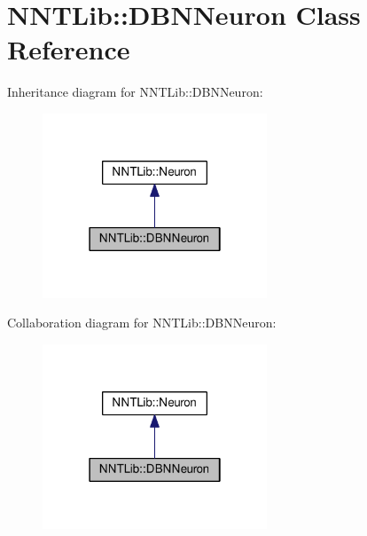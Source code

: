 \hypertarget{class_n_n_t_lib_1_1_d_b_n_neuron}{}\section{N\+N\+T\+Lib\+:\+:D\+B\+N\+Neuron Class Reference}
\label{class_n_n_t_lib_1_1_d_b_n_neuron}


Inheritance diagram for N\+N\+T\+Lib\+:\+:D\+B\+N\+Neuron\+:\nopagebreak
\begin{figure}[H]
\begin{center}
\leavevmode
\includegraphics[width=190pt]{class_n_n_t_lib_1_1_d_b_n_neuron__inherit__graph}
\end{center}
\end{figure}


Collaboration diagram for N\+N\+T\+Lib\+:\+:D\+B\+N\+Neuron\+:\nopagebreak
\begin{figure}[H]
\begin{center}
\leavevmode
\includegraphics[width=190pt]{class_n_n_t_lib_1_1_d_b_n_neuron__coll__graph}
\end{center}
\end{figure}
